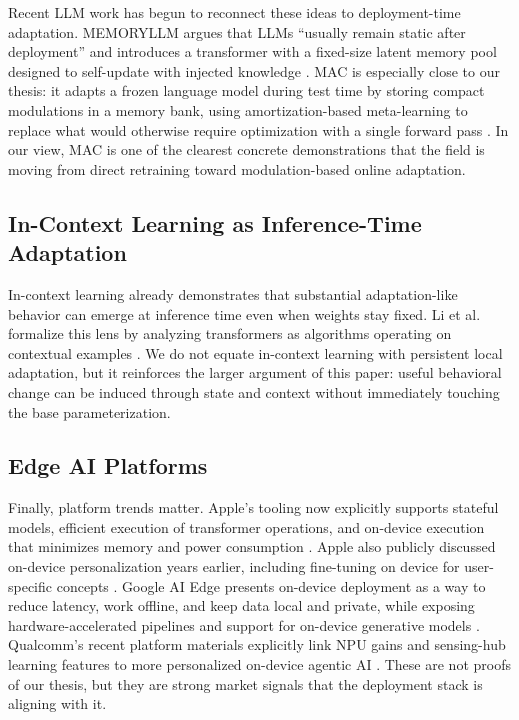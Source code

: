 \documentclass[11pt,a4paper]{article}
\begin{document}
Recent LLM work has begun to reconnect these ideas to deployment-time adaptation. MEMORYLLM argues that LLMs ``usually remain static after deployment'' and introduces a transformer with a fixed-size latent memory pool designed to self-update with injected knowledge \cite{wang2024memoryllm}. MAC is especially close to our thesis: it adapts a frozen language model during test time by storing compact modulations in a memory bank, using amortization-based meta-learning to replace what would otherwise require optimization with a single forward pass \cite{tack2024mac}. In our view, MAC is one of the clearest concrete demonstrations that the field is moving from direct retraining toward modulation-based online adaptation.

\subsection{In-Context Learning as Inference-Time Adaptation}

In-context learning already demonstrates that substantial adaptation-like behavior can emerge at inference time even when weights stay fixed. Li et al. formalize this lens by analyzing transformers as algorithms operating on contextual examples \cite{li2023icl}. We do not equate in-context learning with persistent local adaptation, but it reinforces the larger argument of this paper: useful behavioral change can be induced through state and context without immediately touching the base parameterization.

\subsection{Edge AI Platforms}

Finally, platform trends matter. Apple's tooling now explicitly supports stateful models, efficient execution of transformer operations, and on-device execution that minimizes memory and power consumption \cite{apple_coreml}. Apple also publicly discussed on-device personalization years earlier, including fine-tuning on device for user-specific concepts \cite{apple_wwdc19}. Google AI Edge presents on-device deployment as a way to reduce latency, work offline, and keep data local and private, while exposing hardware-accelerated pipelines and support for on-device generative models \cite{google_edge}. Qualcomm's recent platform materials explicitly link NPU gains and sensing-hub learning features to more personalized on-device agentic AI \cite{qualcomm_2025}. These are not proofs of our thesis, but they are strong market signals that the deployment stack is aligning with it.
\end{document}
